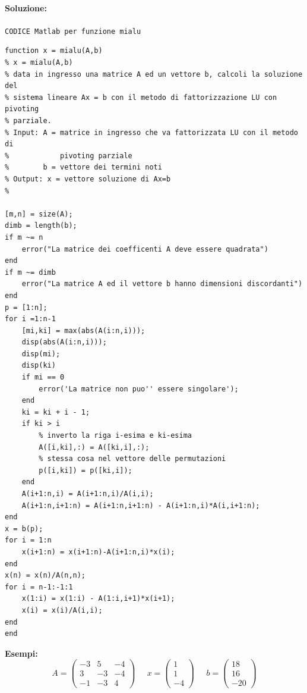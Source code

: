 \documentclass[12pt]{article}
\begin{document}
\paragraph{Soluzione:}
\texttt{CODICE Matlab per funzione mialu}
\begin{lstlisting}[frame=single]
function x = mialu(A,b)
% x = mialu(A,b)
% data in ingresso una matrice A ed un vettore b, calcoli la soluzione del 
% sistema lineare Ax = b con il metodo di fattorizzazione LU con pivoting 
% parziale. 
% Input: A = matrice in ingresso che va fattorizzata LU con il metodo di 
%            pivoting parziale
%        b = vettore dei termini noti
% Output: x = vettore soluzione di Ax=b
%

[m,n] = size(A);
dimb = length(b);
if m ~= n 
    error("La matrice dei coefficenti A deve essere quadrata")
end
if m ~= dimb
    error("La matrice A ed il vettore b hanno dimensioni discordanti")
end
p = [1:n];
for i =1:n-1
    [mi,ki] = max(abs(A(i:n,i)));
    disp(abs(A(i:n,i)));
    disp(mi);
    disp(ki)
    if mi == 0
        error('La matrice non puo'' essere singolare');
    end
    ki = ki + i - 1;
    if ki > i 
        % inverto la riga i-esima e ki-esima
        A([i,ki],:) = A([ki,i],:);
        % stessa cosa nel vettore delle permutazioni
        p([i,ki]) = p([ki,i]);
    end
    A(i+1:n,i) = A(i+1:n,i)/A(i,i);
    A(i+1:n,i+1:n) = A(i+1:n,i+1:n) - A(i+1:n,i)*A(i,i+1:n);
end
x = b(p);
for i = 1:n
    x(i+1:n) = x(i+1:n)-A(i+1:n,i)*x(i);
end
x(n) = x(n)/A(n,n);
for i = n-1:-1:1
    x(1:i) = x(1:i) - A(1:i,i+1)*x(i+1);
    x(i) = x(i)/A(i,i);
end
end
\end{lstlisting}
\textbf{Esempi:}
\begin{equation}A=
    \begin{pmatrix}
        -3 & 5 & -4 \\
        3 & -3 & -4 \\
        -1 & -3 & 4 
    \end{pmatrix}\;\;\;\;\;x=
    \begin{pmatrix}
        1 \\
        1 \\
        -4  
    \end{pmatrix}\;\;\;\;\;b=
    \begin{pmatrix}
        18 \\
        16\\
        -20  
    \end{pmatrix}
\end{equation}
\end{document}
